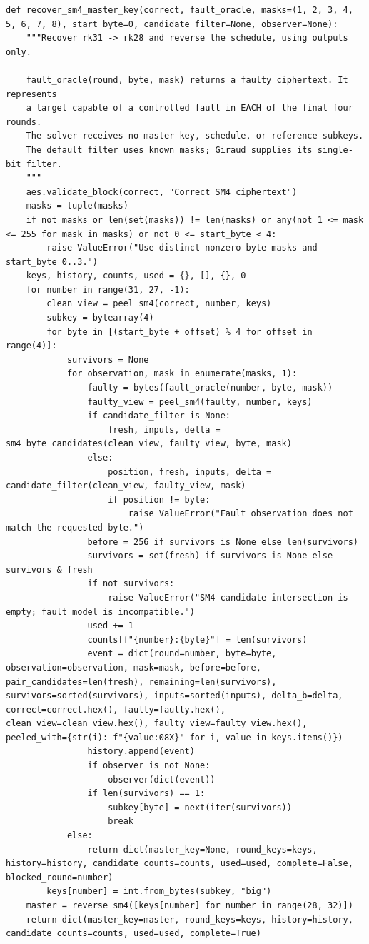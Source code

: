 \documentclass[11pt,a4paper]{report}
\begin{document}
\begin{lstlisting}[style=pycode,caption={Sequential recovery of four SM4 subkeys, from piret.py}]
def recover_sm4_master_key(correct, fault_oracle, masks=(1, 2, 3, 4, 5, 6, 7, 8), start_byte=0, candidate_filter=None, observer=None):
    """Recover rk31 -> rk28 and reverse the schedule, using outputs only.

    fault_oracle(round, byte, mask) returns a faulty ciphertext. It represents
    a target capable of a controlled fault in EACH of the final four rounds.
    The solver receives no master key, schedule, or reference subkeys.
    The default filter uses known masks; Giraud supplies its single-bit filter.
    """
    aes.validate_block(correct, "Correct SM4 ciphertext")
    masks = tuple(masks)
    if not masks or len(set(masks)) != len(masks) or any(not 1 <= mask <= 255 for mask in masks) or not 0 <= start_byte < 4:
        raise ValueError("Use distinct nonzero byte masks and start_byte 0..3.")
    keys, history, counts, used = {}, [], {}, 0
    for number in range(31, 27, -1):
        clean_view = peel_sm4(correct, number, keys)
        subkey = bytearray(4)
        for byte in [(start_byte + offset) % 4 for offset in range(4)]:
            survivors = None
            for observation, mask in enumerate(masks, 1):
                faulty = bytes(fault_oracle(number, byte, mask))
                faulty_view = peel_sm4(faulty, number, keys)
                if candidate_filter is None:
                    fresh, inputs, delta = sm4_byte_candidates(clean_view, faulty_view, byte, mask)
                else:
                    position, fresh, inputs, delta = candidate_filter(clean_view, faulty_view, mask)
                    if position != byte:
                        raise ValueError("Fault observation does not match the requested byte.")
                before = 256 if survivors is None else len(survivors)
                survivors = set(fresh) if survivors is None else survivors & fresh
                if not survivors:
                    raise ValueError("SM4 candidate intersection is empty; fault model is incompatible.")
                used += 1
                counts[f"{number}:{byte}"] = len(survivors)
                event = dict(round=number, byte=byte, observation=observation, mask=mask, before=before, pair_candidates=len(fresh), remaining=len(survivors), survivors=sorted(survivors), inputs=sorted(inputs), delta_b=delta, correct=correct.hex(), faulty=faulty.hex(), clean_view=clean_view.hex(), faulty_view=faulty_view.hex(), peeled_with={str(i): f"{value:08X}" for i, value in keys.items()})
                history.append(event)
                if observer is not None:
                    observer(dict(event))
                if len(survivors) == 1:
                    subkey[byte] = next(iter(survivors))
                    break
            else:
                return dict(master_key=None, round_keys=keys, history=history, candidate_counts=counts, used=used, complete=False, blocked_round=number)
        keys[number] = int.from_bytes(subkey, "big")
    master = reverse_sm4([keys[number] for number in range(28, 32)])
    return dict(master_key=master, round_keys=keys, history=history, candidate_counts=counts, used=used, complete=True)
\end{lstlisting}
\end{document}

